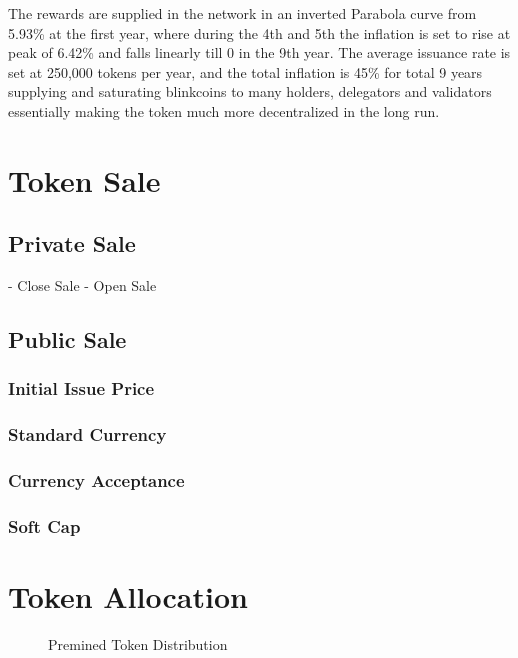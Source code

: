\documentclass[a4paper,12pt]{article}
\begin{document}
The rewards are supplied in the network in an inverted Parabola curve from 5.93\% at the first year, where during the 4th and 5th the inflation is set to rise at peak of 6.42\% and falls linearly till 0 in the 9th year. The average issuance rate is set at 250,000 tokens per year, and the total inflation is 45\% for total 9 years supplying and saturating blinkcoins to many holders, delegators and validators essentially making the token much more decentralized in the long run.\\

\section{Token Sale}

\subsection{Private Sale}

- Close Sale
- Open Sale

\subsection{Public Sale}

\subsubsection{Initial Issue Price}

\subsubsection{Standard Currency}

\subsubsection{Currency Acceptance}

\subsubsection{Soft Cap}

\section{Token Allocation}

\begin{center}
\begin{figure}[H]
\centering
{}
\caption{Premined Token Distribution}
\end{figure}
\end{center}
\end{document}
